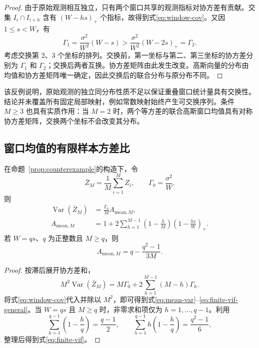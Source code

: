 \begin{proof}
由于原始观测相互独立，只有两个窗口共享的观测指标对协方差有贡献。交集 $I_i\cap I_{i+h}$ 含有 $(W-hs)_+$ 个指标，故得到式\eqref{eq:window-cov}。又因 $1\le s<W$，有
\[
 \Gamma_1=\frac{\sigma^2}{W^2}(W-s)
 >\frac{\sigma^2}{W^2}(W-2s)_+=\Gamma_2.
\]
考虑交换第 2、3 个坐标的排列。交换前，第一坐标与第二、第三坐标的协方差分别为 $\Gamma_1$ 和 $\Gamma_2$；交换后两者互换。协方差矩阵由此发生改变。高斯向量的分布由均值和协方差矩阵唯一确定，因此交换后的联合分布与原分布不同。
\end{proof}

\begin{remark}
该反例说明，原始观测的独立同分布性质不足以保证重叠窗口统计量具有交换性。结论并未覆盖所有固定局部映射，例如常数映射始终产生可交换序列。条件 $M\ge3$ 也具有实质作用：当 $M=2$ 时，两个等方差的联合高斯窗口均值具有对称协方差矩阵，交换两个坐标不会改变其分布。
\end{remark}

\subsection{窗口均值的有限样本方差比}\label{sec:t3}

\begin{proposition}[窗口均值的精确方差比]\label{prop:variance}
在命题~\ref{prop:counterexample}的构造下，令
\[
 \bar Z_M=\frac1M\sum_{i=1}^M Z_i,
 \qquad \Gamma_0=\frac{\sigma^2}{W}.
\]
则
\begin{align}
 \operatorname{Var}(\bar Z_M)
 &=\frac{\Gamma_0}{M}A_{\mathrm{mean},M},\label{eq:mean-var}\\
 A_{\mathrm{mean},M}
 &=1+2\sum_{h=1}^{M-1}
 \left(1-\frac hM\right)
 \left(1-\frac{hs}{W}\right)_+.
 \label{eq:finite-vif-general}
\end{align}
若 $W=qs$、$q$ 为正整数且 $M\ge q$，则
\begin{equation}\label{eq:finite-vif}
 A_{\mathrm{mean},M}=q-\frac{q^2-1}{3M}.
\end{equation}
\end{proposition}

\begin{proof}
按滞后展开协方差和，
\[
 M^2\operatorname{Var}(\bar Z_M)
 =M\Gamma_0+2\sum_{h=1}^{M-1}(M-h)\Gamma_h.
\]
将式\eqref{eq:window-cov}代入并除以 $M^2$，即可得到式\eqref{eq:mean-var}--\eqref{eq:finite-vif-general}。当 $W=qs$ 且 $M\ge q$ 时，非零求和项仅为 $h=1,\ldots,q-1$。利用
\[
 \sum_{h=1}^{q-1}\left(1-\frac hq\right)=\frac{q-1}{2},
 \qquad
 \sum_{h=1}^{q-1}h\left(1-\frac hq\right)=\frac{q^2-1}{6},
\]
整理后得到式\eqref{eq:finite-vif}。
\end{proof}

